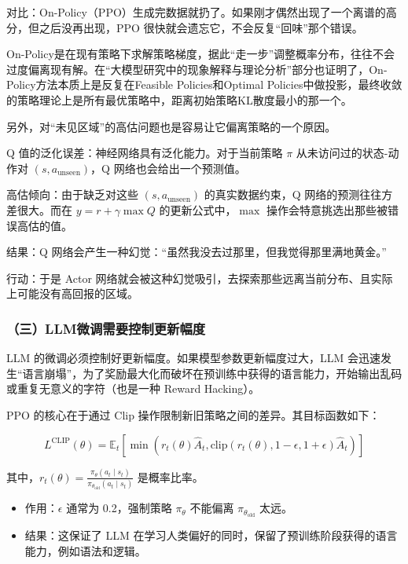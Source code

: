 对比：On-Policy（PPO）生成完数据就扔了。如果刚才偶然出现了一个离谱的高分，但之后没再出现，PPO 很快就会遗忘它，不会反复``回味''那个错误。

On-Policy是在现有策略下求解策略梯度，据此``走一步''调整概率分布，往往不会过度偏离现有解。在``大模型研究中的现象解释与理论分析''部分也证明了，On-Policy方法本质上是反复在Feasible Policies和Optimal Policies中做投影，最终收敛的策略理论上是所有最优策略中，距离初始策略KL散度最小的那一个。

另外，对``未见区域''的高估问题也是容易让它偏离策略的一个原因。

Q 值的泛化误差：神经网络具有泛化能力。对于当前策略 \(\pi\) 从未访问过的状态-动作对 \((s,a_{\mathrm{unseen}})\)，Q 网络也会给出一个预测值。

高估倾向：由于缺乏对这些 \((s,a_{\mathrm{unseen}})\) 的真实数据约束，Q 网络的预测往往方差很大。而在 \(y=r+\gamma\max Q\) 的更新公式中，\(\max\) 操作会特意挑选出那些被错误高估的值。

结果：Q 网络会产生一种幻觉：``虽然我没去过那里，但我觉得那里满地黄金。''

行动：于是 Actor 网络就会被这种幻觉吸引，去探索那些远离当前分布、且实际上可能没有高回报的区域。

\hypertarget{ux4e09llmux5faeux8c03ux9700ux8981ux63a7ux5236ux66f4ux65b0ux5e45ux5ea6}{%
\subsubsection{（三）LLM微调需要控制更新幅度}\label{ux4e09llmux5faeux8c03ux9700ux8981ux63a7ux5236ux66f4ux65b0ux5e45ux5ea6}}

LLM 的微调必须控制好更新幅度。如果模型参数更新幅度过大，LLM 会迅速发生``语言崩塌''，为了奖励最大化而破坏在预训练中获得的语言能力，开始输出乱码或重复无意义的字符（也是一种 Reward Hacking）。

PPO 的核心在于通过 Clip 操作限制新旧策略之间的差异。其目标函数如下：

\[
L^{\mathrm{CLIP}}(\theta)
=
\mathbb{E}_t
\left[
\min
\left(
r_t(\theta)\hat{A}_t,
\mathrm{clip}(r_t(\theta),1-\epsilon,1+\epsilon)\hat{A}_t
\right)
\right]
\]

其中，\(r_t(\theta)=\frac{\pi_\theta(a_t\mid s_t)}{\pi_{\theta_{\mathrm{old}}}(a_t\mid s_t)}\) 是概率比率。

\begin{itemize}
\tightlist
\item
  作用：\(\epsilon\) 通常为 0.2，强制策略 \(\pi_\theta\) 不能偏离 \(\pi_{\theta_{\mathrm{old}}}\) 太远。
\item
  结果：这保证了 LLM 在学习人类偏好的同时，保留了预训练阶段获得的语言能力，例如语法和逻辑。
\end{itemize}

